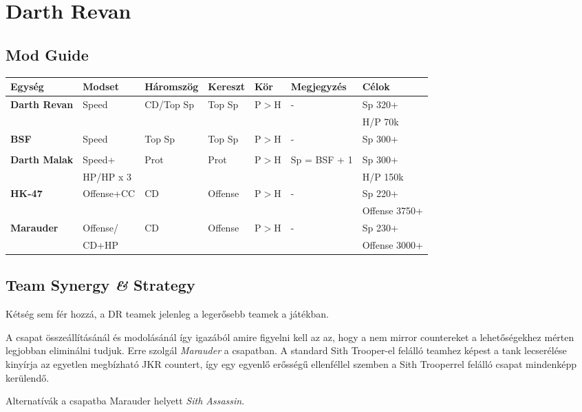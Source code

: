 \documentclass[11pt]{report}
\begin{document}
\chapter{Darth Revan}
\section{Mod Guide}
\begin{center}
    \begin{tabular}{|l | l | l | l | l | l | l |}
        \hline
        Egység & Modset & Háromszög & Kereszt & Kör & Megjegyzés & Célok\\ \hline
        \textbf{Darth Revan} & Speed & CD/Top Sp & Top Sp & P$>$H & - & Sp 320+\\ 
        &  &  &  &  &  & H/P 70k\\ \hline
        \textbf{BSF} & Speed & Top Sp & Top Sp & P$>$H & - & Sp 300+\\
        &  &  &  &  &  & \\ \hline
        \textbf{Darth Malak} & Speed+ & Prot & Prot & P$>$H & Sp = BSF + 1 & Sp 300+\\
        & HP/HP x 3 &  &  &  &  & H/P 150k\\ \hline
        \textbf{HK-47} & Offense+CC & CD & Offense & P$>$H & - & Sp 220+\\
        &  &  &  &  &  & Offense 3750+\\ \hline
        \textbf{Marauder} & Offense/ & CD & Offense & P$>$H & - & Sp 230+\\
        & CD+HP &  &  &  &  & Offense 3000+\\ \hline
    \end{tabular}
\end{center}
\section{Team Synergy \textit{\&} Strategy}
Kétség sem fér hozzá, a DR teamek jelenleg a legerősebb teamek a játékban. \par
A csapat összeállításánál és modolásánál így igazából amire figyelni kell az az, hogy a nem mirror countereket a lehetőségekhez mérten legjobban eliminálni tudjuk. Erre szolgál \emph{Marauder} a csapatban. A standard Sith Trooper-el felálló teamhez képest a tank lecserélése kinyírja az egyetlen megbízható JKR countert, így egy egyenlő erősségű ellenféllel szemben a Sith Trooperrel felálló csapat mindenképp kerülendő.\par
Alternatívák a csapatba Marauder helyett \emph{Sith Assassin}.
\end{document}
